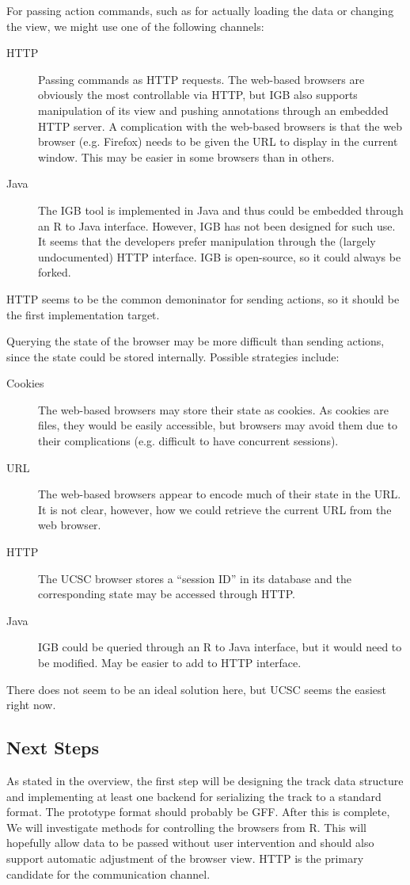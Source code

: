 \documentclass{article}
\begin{document}
For passing action commands, such as for actually loading the
data or changing the view, we might use one of the following channels:
\begin{description}
\item[HTTP] Passing commands as HTTP requests. The web-based browsers
are obviously the most controllable via HTTP, but IGB also supports manipulation of its view and pushing annotations through an embedded HTTP server. A complication with the web-based browsers is that the web browser (e.g. Firefox) needs to be given the URL to display in the current window. This may be easier in some browsers than in others.
\item[Java] The IGB tool is implemented in Java and thus could be
embedded through an R to Java interface. However, IGB has not been
designed for such use. It seems that the developers prefer
manipulation through the (largely undocumented) HTTP interface. IGB is
open-source, so it could always be forked.
\end{description}
HTTP seems to be the common demoninator for sending actions, so it
should be the first implementation target.

Querying the state of the browser may be more difficult than sending
actions, since the state could be stored internally. Possible
strategies include:
\begin{description}
\item[Cookies] The web-based browsers may store their state as
cookies. As cookies are files, they would be easily accessible, but
browsers may avoid them due to their complications (e.g. difficult to
have concurrent sessions).
\item[URL] The web-based browsers appear to encode much of their state
in the URL. It is not clear, however, how we could retrieve the
current URL from the web browser.
\item[HTTP] The UCSC browser stores a ``session ID'' in its database and the corresponding state may be accessed through HTTP.
\item[Java] IGB could be queried through an R to Java interface, but it would need to be modified. May be easier to add to HTTP interface.
\end{description}
There does not seem to be an ideal solution here, but UCSC seems the easiest right now.

\subsection*{Next Steps}
\label{sec:next-steps}

As stated in the overview, the first step will be designing the track
data structure and implementing at least one backend for serializing
the track to a standard format. The prototype format should probably
be GFF. After this is complete, We will investigate methods for
controlling the browsers from R. This will hopefully allow data to be
passed without user intervention and should also support automatic
adjustment of the browser view. HTTP is the primary candidate for the
communication channel.
\end{document}
